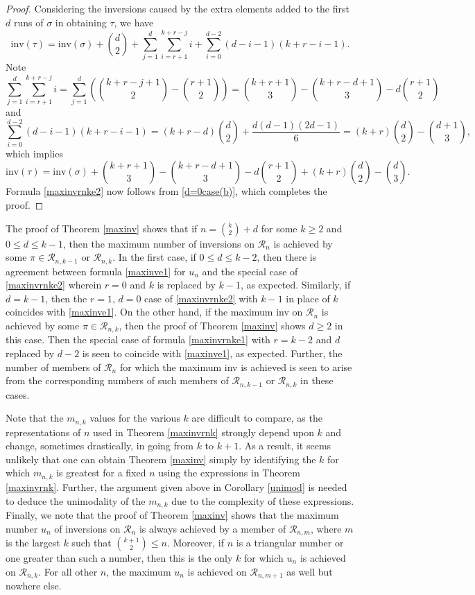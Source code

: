 \documentclass[11pt,a4paper]{article}
\begin{document}
\begin{proof}
Considering the inversions caused by the extra elements added to the first $d$ runs of $\sigma$ in obtaining $\tau$, we have
$$\text{inv}(\tau)=\text{inv}(\sigma)+\binom{d}{2}+\sum_{j=1}^d\sum_{i=r+1}^{k+r-j}i+\sum_{i=0}^{d-2}(d-i-1)(k+r-i-1).$$
Note
$$\sum_{j=1}^d\sum_{i=r+1}^{k+r-j}i=\sum_{j=1}^d\left(\binom{k+r-j+1}{2}-\binom{r+1}{2}\right)=\binom{k+r+1}{3}-\binom{k+r-d+1}{3}-d\binom{r+1}{2}$$
and
$$\sum_{i=0}^{d-2}(d-i-1)(k+r-i-1)=(k+r-d)\binom{d}{2}+\frac{d(d-1)(2d-1)}{6}=(k+r)\binom{d}{2}-\binom{d+1}{3},$$
which implies
$$\text{inv}(\tau)=\text{inv}(\sigma)+\binom{k+r+1}{3}-\binom{k+r-d+1}{3}-d\binom{r+1}{2}+(k+r)\binom{d}{2}-\binom{d}{3}.$$
Formula \eqref{maxinvrnke2} now follows from \eqref{d=0case(b)}, which completes the proof.
\end{proof}

The proof of Theorem \ref{maxinv} shows that if $n=\binom{k}{2}+d$ for some $k \geq 2$ and $0 \leq d \leq k-1$, then the maximum number of inversions on $\mathcal{R}_{n}$ is achieved by some $\pi \in \mathcal{R}_{n,k-1}$ or $\mathcal{R}_{n,k}$.  In the first case, if $0 \leq d \leq k-2$, then there is agreement between formula \eqref{maxinve1} for $u_n$ and the special case of \eqref{maxinvrnke2} wherein $r=0$ and $k$ is replaced by $k-1$, as expected.  Similarly, if $d=k-1$, then the $r=1,\,d=0$ case of \eqref{maxinvrnke2} with $k-1$ in place of $k$ coincides with \eqref{maxinve1}. On the other hand, if the maximum inv on $\mathcal{R}_n$ is achieved by some $\pi \in\mathcal{R}_{n,k}$, then the proof of Theorem \ref{maxinv} shows $d \geq 2$ in this case.  Then the special case of formula \eqref{maxinvrnke1} with $r=k-2$ and $d$ replaced by $d-2$ is seen to coincide with \eqref{maxinve1}, as expected.  Further, the number of members of $\mathcal{R}_n$ for which the maximum inv is achieved is seen to arise from the corresponding numbers of such members of $\mathcal{R}_{n,k-1}$ or $\mathcal{R}_{n,k}$ in these cases.

Note that the $m_{n,k}$ values for the various $k$ are difficult to compare, as  the representations of $n$ used in Theorem \ref{maxinvrnk} strongly depend upon $k$ and change, sometimes drastically, in going from $k$ to $k+1$.  As a result, it seems unlikely that one can obtain Theorem \ref{maxinv} simply by identifying the $k$ for which  $m_{n,k}$ is greatest for a fixed $n$ using the expressions in Theorem \ref{maxinvrnk}.  Further, the argument given above in Corollary \ref{unimod} is needed to deduce the unimodality of the $m_{n,k}$ due to the complexity of these expressions.  Finally, we note that the proof of Theorem \ref{maxinv} shows that the maximum number $u_n$ of inversions on $\mathcal{R}_n$ is always achieved by a member of $\mathcal{R}_{n,m}$, where $m$ is the largest $k$ such that $\binom{k+1}{2} \leq n$.  Moreover, if $n$ is a triangular number or one greater than such a number, then this is the only $k$ for which $u_n$ is achieved on  $\mathcal{R}_{n,k}$.  For all other $n$, the maximum $u_n$ is achieved on $\mathcal{R}_{n,m+1}$ as well but nowhere else.
\end{document}
